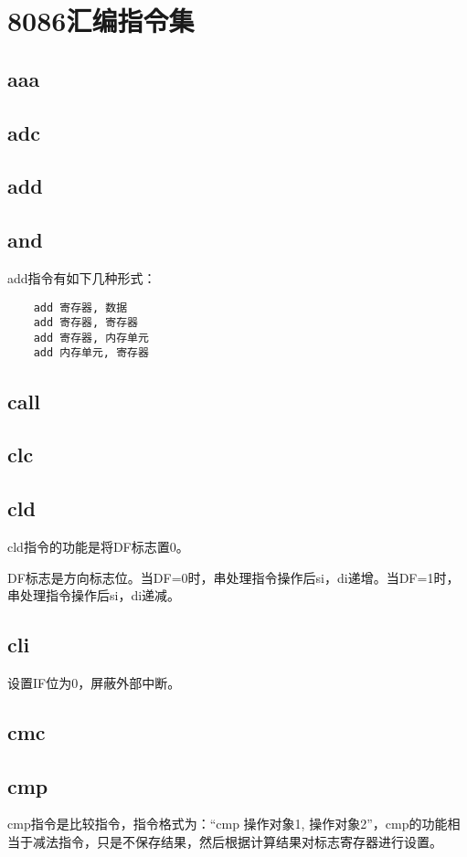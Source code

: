 \documentclass[a4paper,left=2.5cm,right=2.5cm,11pt]{article}
\begin{document}
\tableofcontents

\clearpage

\section{8086汇编指令集}
\subsection{aaa}
\subsection{adc}
\subsection{add}
\subsection{and}
	add指令有如下几种形式：
	\begin{lstlisting}
	add 寄存器, 数据
	add 寄存器, 寄存器
	add 寄存器, 内存单元
	add 内存单元, 寄存器
	\end{lstlisting}

\subsection{call}
\subsection{clc}
\subsection{cld}
	cld指令的功能是将DF标志置0。\par

	DF标志是方向标志位。当DF=0时，串处理指令操作后si，di递增。当DF=1时，串处理指令操作后si，di递减。

\subsection{cli}
	设置IF位为0，屏蔽外部中断。

\subsection{cmc}
\subsection{cmp}
	cmp指令是比较指令，指令格式为：“cmp 操作对象1, 操作对象2”，cmp的功能相当于减法指令，只是不保存结果，然后根据计算结果对标志寄存器进行设置。
	
\end{document}
